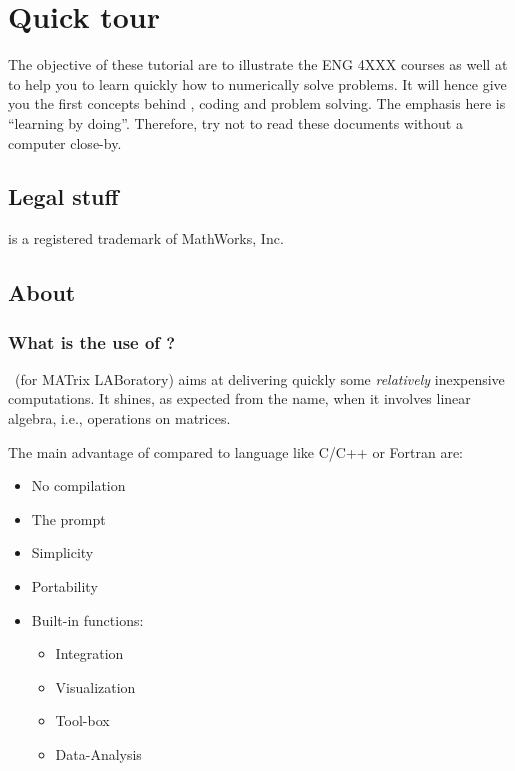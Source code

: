



\chapter{Quick tour \matlab}
	The objective of these tutorial are to illustrate the ENG 4XXX courses as well at to help you to learn quickly how to numerically solve problems.
	It will hence give you the first concepts behind \matlab, coding and problem solving.
	The emphasis here is “learning by doing”. Therefore, try not to read these documents without a computer close-by.

\section*{Legal stuff}
\matlab is a registered trademark of MathWorks, Inc.



\section{About \matlab}
	\subsection{What is the use of \matlab ?}
		\matlab~(for MATrix LABoratory) aims at delivering quickly some \emph{relatively} inexpensive computations.
		It shines, as expected from the name, when it involves linear algebra, i.e., operations on matrices.

		The main advantage of \matlab compared to language like C/C++ or Fortran are:
		\begin{itemize}
			\item No compilation
			\item The prompt
			\item Simplicity
			\item Portability
			\item Built-in functions:
				\begin{itemize}
					\item Integration
					\item Visualization
					\item Tool-box
					\item Data-Analysis
				\end{itemize}
		\end{itemize}

